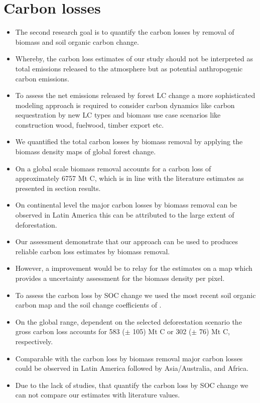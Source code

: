 	\section{Carbon losses}
		\begin{itemize}
			\item The second research goal is to quantify the carbon losses by removal of biomass and soil organic carbon change.
			\item Whereby, the carbon loss estimates of our study should not be interpreted as total emissions released to the atmosphere but as potential anthropogenic carbon emissions.
			\item To assess the net emissions released by forest \ac{LC} change a more sophisticated modeling approach is required to consider carbon dynamics like carbon sequestration by new \ac{LC} types and biomass use case scenarios like construction wood, fuelwood, timber export etc.
			\item We quantified the total carbon losses by biomass removal by applying the biomass density maps of global forest change.
			\item On a global scale biomass removal accounts for a carbon loss of approximately 6757 Mt C, which is in line with the literature estimates as presented in section results.
			\item On continental level the major carbon losses by biomass removal can be observed in Latin America this can be attributed to the large extent of deforestation.
			\item Our assessment demonstrate that our approach can be used to produces reliable carbon loss estimates by biomass removal.
			\item However, a improvement would be to relay for the estimates on a map which provides a uncertainty assessment for the biomass density per pixel.
			\item To assess the carbon loss by \ac{SOC} change we used the most recent soil organic carbon map and the soil change coefficients of \citet{Don2010}.
			\item On the global range, dependent on the selected deforestation scenario the gross carbon loss accounts for 583 ($\pm$ 105) Mt C or 302 ($\pm$ 76) Mt C, respectively.
			\item Comparable with the carbon loss by biomass removal major carbon losses could be observed in Latin America followed by Asia/Australia, and Africa.
			\item Due to the lack of studies, that quantify the carbon loss by \ac{SOC} change we can not compare our estimates with literature values.

\end{itemize}
